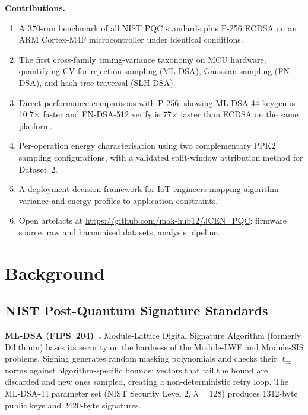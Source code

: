 \documentclass[iicol]{sn-jnl}
\begin{document}
\textbf{Contributions.}\quad
\begin{enumerate}
  \item A 370-run benchmark of all NIST PQC standards plus P-256 ECDSA
        on an ARM Cortex-M4F microcontroller under identical conditions.
  \item The first cross-family timing-variance taxonomy on MCU hardware,
        quantifying CV for rejection sampling (ML-DSA), Gaussian
        sampling (FN-DSA), and hash-tree traversal (SLH-DSA).
  \item Direct performance comparisons with P-256, showing ML-DSA-44
        keygen is 10.7$\times$ faster and FN-DSA-512 verify is
        77$\times$ faster than ECDSA on the same platform.
  \item Per-operation energy characterisation using two complementary
        PPK2 sampling configurations, with a validated split-window
        attribution method for Dataset~2.
  \item A deployment decision framework for IoT engineers mapping
        algorithm variance and energy profiles to application constraints.
  \item Open artefacts at \url{https://github.com/mak-hub12/JCEN_PQC}:
        firmware source, raw and harmonised datasets, analysis pipeline.
\end{enumerate}

\section{Background}
\label{sec:background}

\subsection{NIST Post-Quantum Signature Standards}

\textbf{ML-DSA (FIPS~204)~\cite{nist-fips204}.}
Module-Lattice Digital Signature Algorithm (formerly Dilithium) bases its
security on the hardness of the Module-LWE and Module-SIS problems.
Signing generates random masking polynomials and checks their $\ell_\infty$
norms against algorithm-specific bounds; vectors that fail the bound are
discarded and new ones sampled, creating a non-deterministic retry loop.
The ML-DSA-44 parameter set (NIST Security Level 2, $\lambda = 128$) produces
1312-byte public keys and 2420-byte signatures.
\end{document}
